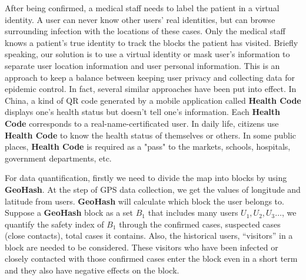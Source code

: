 \documentclass[conference]{IEEEtran}
\begin{document}
After being confirmed, a medical staff needs to label the patient in a virtual identity.
A user can never know other users' real identities, but can browse surrounding infection with the locations of these cases.
Only the medical staff knows a patient's true identity to track the blocks the patient has visited.
Briefly speaking, our solution is to use a virtual identity or mask user's information to separate user location information and user personal information.
This is an approach to keep a balance between keeping user privacy and collecting data for epidemic control.
In fact, several similar approaches have been put into effect.
In China, a kind of QR code generated by a mobile application called \textbf{Health Code} displays one's health status but doesn't tell one's information.
Each \textbf{Health Code} corresponds to a real-name-certificated user.
In daily life, citizens use \textbf{Health Code} to know the health status of themselves or others.
In some public places, \textbf{Health Code} is required as a "pass" to the markets, schools, hospitals, government departments, etc.

For data quantification, firstly we need to divide the map into blocks by using \textbf{GeoHash}.
At the step of GPS data collection, we get the values of longitude and latitude from users.
\textbf{GeoHash} will calculate which block the user belongs to.
Suppose a \textbf{GeoHash} block as a set $B_1$ that includes many users $U_1, U_2, U_3\ldots$, we quantify the safety index of $B_1$ through the confirmed cases, suspected cases (close contacts), total cases it contains.
Also, the historical users, ``visitors'' in a block are needed to be considered.
These visitors who have been infected or closely contacted with those confirmed cases enter the block even in a short term and they also have negative effects on the block.
\end{document}
